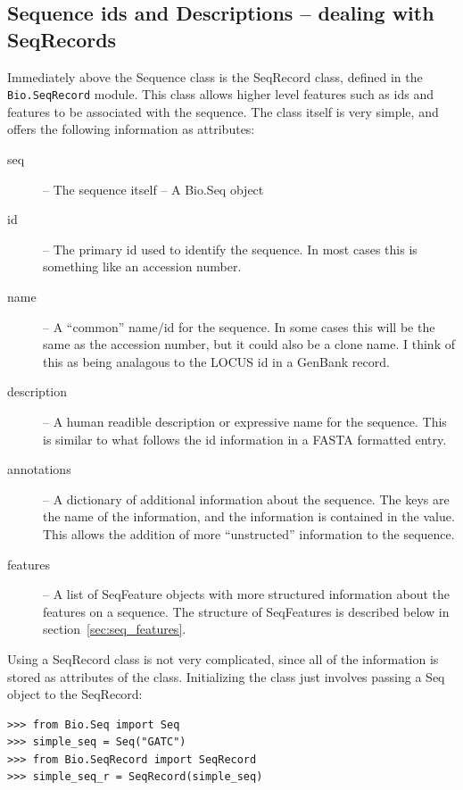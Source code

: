\documentclass{report}
\begin{document}
\subsection{Sequence ids and Descriptions -- dealing with SeqRecords}

Immediately above the Sequence class is the SeqRecord class, defined in the \verb|Bio.SeqRecord| module. This class allows higher level features such as ids and features to be associated with the sequence. The class itself is very simple, and offers the following information as attributes:

\begin{description}
  \item[seq] -- The sequence itself -- A Bio.Seq object

  \item[id] -- The primary id used to identify the sequence. In most cases this is something like an accession number.

  \item[name] -- A ``common'' name/id for the sequence. In some cases this will be the same as the accession number, but it could also be a clone name. I think of this as being analagous to the LOCUS id in a GenBank record.

  \item[description] -- A human readible description or expressive name for the sequence. This is similar to what follows the id information in a FASTA formatted entry.

  \item[annotations] -- A dictionary of additional information about the sequence. The keys are the name of the information, and the information is contained in the value. This allows the addition of more ``unstructed'' information to the sequence.

  \item[features] -- A list of SeqFeature objects with more structured information about the features on a sequence. The structure of SeqFeatures is described below in section~\ref{sec:seq_features}.
\end{description}

Using a SeqRecord class is not very complicated, since all of the information is stored as attributes of the class. Initializing the class just involves passing a Seq object to the SeqRecord:

\begin{verbatim}
>>> from Bio.Seq import Seq
>>> simple_seq = Seq("GATC")
>>> from Bio.SeqRecord import SeqRecord
>>> simple_seq_r = SeqRecord(simple_seq)
\end{verbatim}
\end{document}
